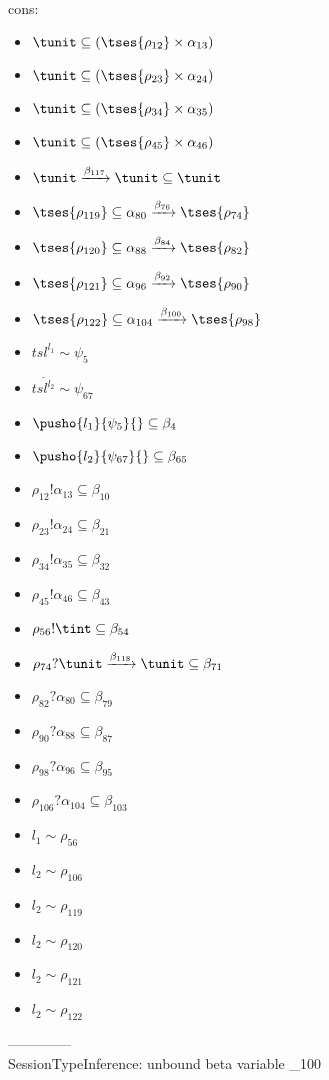 \documentclass[12pt]{article}
\begin{document}
\\  cons: \begin{itemize}
\item $ \tunit \subseteq ( \tses{ \rho_{12}} \times \alpha_{13}) $
\item $ \tunit \subseteq ( \tses{ \rho_{23}} \times \alpha_{24}) $
\item $ \tunit \subseteq ( \tses{ \rho_{34}} \times \alpha_{35}) $
\item $ \tunit \subseteq ( \tses{ \rho_{45}} \times \alpha_{46}) $
\item $ \tunit \xrightarrow{\beta_{117}} \tunit \subseteq \tunit $
\item $  \tses{ \rho_{119}} \subseteq \alpha_{80} \xrightarrow{\beta_{76}}  \tses{ \rho_{74}} $
\item $  \tses{ \rho_{120}} \subseteq \alpha_{88} \xrightarrow{\beta_{84}}  \tses{ \rho_{82}} $
\item $  \tses{ \rho_{121}} \subseteq \alpha_{96} \xrightarrow{\beta_{92}}  \tses{ \rho_{90}} $
\item $  \tses{ \rho_{122}} \subseteq \alpha_{104} \xrightarrow{\beta_{100}}  \tses{ \rho_{98}} $
\item $ {tsl}^{l_{1}} \sim\psi_{5} $
\item $ \overline{{tsl}^{l_{2}}} \sim\psi_{67} $
\item $ \pusho{ l_{1}} {\psi_{5}}{} \subseteq \beta_{4} $
\item $ \pusho{ l_{2}} {\psi_{67}}{} \subseteq \beta_{65} $
\item $ \rho_{12}!\alpha_{13} \subseteq \beta_{10} $
\item $ \rho_{23}!\alpha_{24} \subseteq \beta_{21} $
\item $ \rho_{34}!\alpha_{35} \subseteq \beta_{32} $
\item $ \rho_{45}!\alpha_{46} \subseteq \beta_{43} $
\item $ \rho_{56}!\tint \subseteq \beta_{54} $
\item $ \rho_{74}?\tunit \xrightarrow{\beta_{118}} \tunit \subseteq \beta_{71} $
\item $ \rho_{82}?\alpha_{80} \subseteq \beta_{79} $
\item $ \rho_{90}?\alpha_{88} \subseteq \beta_{87} $
\item $ \rho_{98}?\alpha_{96} \subseteq \beta_{95} $
\item $ \rho_{106}?\alpha_{104} \subseteq \beta_{103} $
\item $ l_{1} \sim\rho_{56} $
\item $ l_{2} \sim\rho_{106} $
\item $ l_{2} \sim\rho_{119} $
\item $ l_{2} \sim\rho_{120} $
\item $ l_{2} \sim\rho_{121} $
\item $ l_{2} \sim\rho_{122} $
\end{itemize} 
  --------------\\ 
SessionTypeInference: unbound beta variable \beta_{100}
\end{document}
